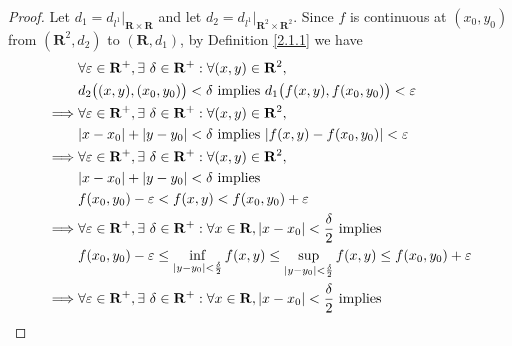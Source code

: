 \begin{proof}
    Let \(d_1 = d_{l^1}|_{\mathbf{R} \times \mathbf{R}}\) and let \(d_2 = d_{l^1}|_{\mathbf{R}^2 \times \mathbf{R}^2}\).
    Since \(f\) is continuous at \((x_0, y_0)\) from \((\mathbf{R}^2, d_2)\) to \((\mathbf{R}, d_1)\), by Definition \ref{2.1.1} we have
    \begin{align*}
                 & \forall \varepsilon \in \mathbf{R}^+, \exists\ \delta \in \mathbf{R}^+ : \forall (x, y) \in \mathbf{R}^2,                                                                            \\
                 & d_2\big((x, y), (x_0, y_0)\big) < \delta \text{ implies } d_1\big(f(x, y), f(x_0, y_0)\big) < \varepsilon                                                                            \\
        \implies & \forall \varepsilon \in \mathbf{R}^+, \exists\ \delta \in \mathbf{R}^+ : \forall (x, y) \in \mathbf{R}^2,                                                                            \\
                 & \abs*{x - x_0} + \abs*{y - y_0} < \delta \text{ implies } \abs*{f(x, y) - f(x_0, y_0)} < \varepsilon                                                                                 \\
        \implies & \forall \varepsilon \in \mathbf{R}^+, \exists\ \delta \in \mathbf{R}^+ : \forall (x, y) \in \mathbf{R}^2,                                                                            \\
                 & \abs*{x - x_0} + \abs*{y - y_0} < \delta \text{ implies}                                                                                                                             \\
                 & f(x_0, y_0) - \varepsilon < f(x, y) < f(x_0, y_0) + \varepsilon                                                                                                                      \\
        \implies & \forall \varepsilon \in \mathbf{R}^+, \exists\ \delta \in \mathbf{R}^+ : \forall x \in \mathbf{R}, \abs*{x - x_0} < \frac{\delta}{2} \text{ implies}                                 \\
                 & f(x_0, y_0) - \varepsilon \leq \inf_{\abs*{y - y_0} < \frac{\delta}{2}} f(x, y) \leq \sup_{\abs*{y - y_0} < \frac{\delta}{2}} f(x, y) \leq f(x_0, y_0) + \varepsilon                 \\
        \implies & \forall \varepsilon \in \mathbf{R}^+, \exists\ \delta \in \mathbf{R}^+ : \forall x \in \mathbf{R}, \abs*{x - x_0} < \frac{\delta}{2} \text{ implies}                                 \\

\end{align*}
\end{proof}

